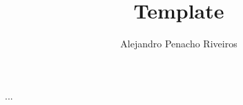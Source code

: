 \documentclass{article}
\author{Alejandro Penacho Riveiros}
\title{Template}
\begin{document}
	...
\end{document}
